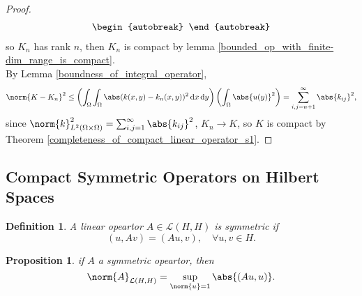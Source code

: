 \documentclass[a4paper]{book}
\newtheorem{defi}[thm]{Definition}
\newtheorem{prop}[thm]{Proposition}
\newcommand\diff{\,\mathrm{d}}
\DeclarePairedDelimiter{\norm}\lVert\rVert
\DeclarePairedDelimiter{\abs}\lvert\rvert
\def\L{\mathcal{L}}
\begin{document}
\begin{proof}
\begin{align*}
\begin{autobreak}
        \end{autobreak}
    \end{align*}
    so $K_n$ has rank $n$, then $K_n$ is compact by lemma \ref{bounded_op_with_finite-dim_range_is_compact}.\\
    By Lemma \ref{boundness_of_integral_operator},
    \begin{align*}
        \norm{K-K_n}^2 \leq \left(\int_{\Omega}\int_{\Omega}\abs(k(x,y)-k_n(x,y))^2 \diff x \diff y\right)\left(\int_{\Omega}\abs{u(y)}^2\right) = \sum_{i,j=n+1}^{\infty}\abs{k_{ij}}^2,
    \end{align*}
    since $\norm{k}_{L^2(\Omega \times \Omega)}^2 = \sum_{i,j=1}^{\infty}\abs{k_{ij}}^2$, $K_n \to K$, so $K$ is compact by Theorem \ref{completeness_of_compact_linear_operator_s1}.
\end{proof}
\subsection{Compact Symmetric Operators on Hilbert Spaces}
\begin{defi}
    A linear opeartor $A \in \L(H,H)$ is symmetric if
    \[
        (u,Av)=(Au,v), \quad \forall u,v \in H.
    \]
\end{defi}
\begin{prop}
    if $A$ a symmetric opeartor, then
    \begin{equation}\label{eq:symmetric_op_norm_inner_pro_to_norm}
        \norm{A}_{\L(H,H)}=\sup_{\norm{u}=1}\abs{(Au,u)}.
    \end{equation}
\end{prop}
\end{document}
